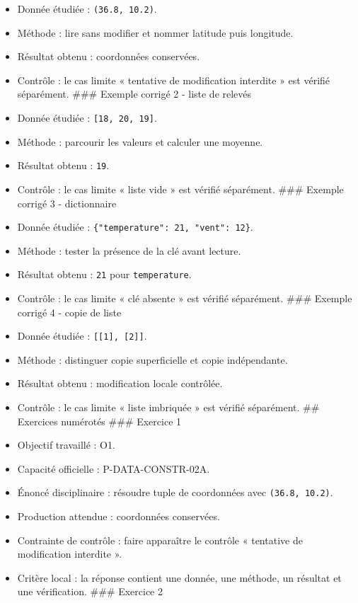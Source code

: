 \begin{itemize}
\tightlist
\item
  Donnée étudiée : \texttt{(36.8,\ 10.2)}.
\item
  Méthode : lire sans modifier et nommer latitude puis longitude.
\item
  Résultat obtenu : coordonnées conservées.
\item
  Contrôle : le cas limite « tentative de modification interdite » est
  vérifié séparément. \#\#\# Exemple corrigé 2 - liste de relevés
\item
  Donnée étudiée : \texttt{{[}18,\ 20,\ 19{]}}.
\item
  Méthode : parcourir les valeurs et calculer une moyenne.
\item
  Résultat obtenu : \texttt{19}.
\item
  Contrôle : le cas limite « liste vide » est vérifié séparément. \#\#\#
  Exemple corrigé 3 - dictionnaire
\item
  Donnée étudiée : \texttt{\{"temperature":\ 21,\ "vent":\ 12\}}.
\item
  Méthode : tester la présence de la clé avant lecture.
\item
  Résultat obtenu : \texttt{21} pour \texttt{temperature}.
\item
  Contrôle : le cas limite « clé absente » est vérifié séparément.
  \#\#\# Exemple corrigé 4 - copie de liste
\item
  Donnée étudiée : \texttt{{[}{[}1{]},\ {[}2{]}{]}}.
\item
  Méthode : distinguer copie superficielle et copie indépendante.
\item
  Résultat obtenu : modification locale contrôlée.
\item
  Contrôle : le cas limite « liste imbriquée » est vérifié séparément.
  \#\# Exercices numérotés \#\#\# Exercice 1
\item
  Objectif travaillé : O1.
\item
  Capacité officielle : P-DATA-CONSTR-02A.
\item
  Énoncé disciplinaire : résoudre tuple de coordonnées avec
  \texttt{(36.8,\ 10.2)}.
\item
  Production attendue : coordonnées conservées.
\item
  Contrainte de contrôle : faire apparaître le contrôle « tentative de
  modification interdite ».
\item
  Critère local : la réponse contient une donnée, une méthode, un
  résultat et une vérification. \#\#\# Exercice 2

\end{itemize}
